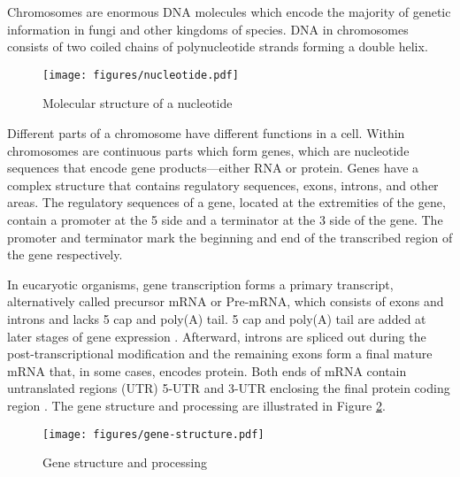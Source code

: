 Chromosomes are enormous DNA molecules which encode the majority of genetic
information in fungi and other kingdoms of species. DNA in chromosomes consists
of two coiled chains of polynucleotide strands forming a double helix.

\begin{figure}
  \centering
  \texttt{[image: figures/nucleotide.pdf]}
  \caption{Molecular structure of a nucleotide \cite{nucleotide-img}}
  \label{fig:intro:nucleotide}
\end{figure}

Different parts of a chromosome have different functions in a cell. Within
chromosomes are continuous parts which form genes, which are nucleotide
sequences that encode gene products---either RNA or protein. Genes have a
complex structure that contains regulatory sequences, exons, introns, and other
areas. The regulatory sequences of a gene, located at the extremities of the
gene, contain a promoter at the 5\textquotesingle{} side and a terminator at
the 3\textquotesingle{} side of the gene. The promoter and terminator mark the
beginning and end of the transcribed region of the gene respectively.

In eucaryotic organisms, gene transcription forms a primary transcript,
alternatively called precursor mRNA or Pre-mRNA, which consists of exons and
introns and lacks 5\textquotesingle{} cap and poly(A) tail. 5\textquotesingle{}
cap and poly(A) tail are added at later stages of gene expression
\cite{cooper2000cell}. Afterward, introns are spliced out during the
post-transcriptional modification and the remaining exons form a final mature
mRNA that, in some cases, encodes protein. Both ends of mRNA contain
untranslated regions (UTR) 5\textquotesingle{}-UTR and 3\textquotesingle{}-UTR
enclosing the final protein coding region \cite{shafee2017eukaryotic}. The gene
structure and processing are illustrated in Figure
\ref{fig:intro:gene-structure}.

\begin{figure}
  \centering
  \texttt{[image: figures/gene-structure.pdf]}
  \caption{Gene structure and processing \cite{shafee2017eukaryotic}}
  \label{fig:intro:gene-structure}
\end{figure}


